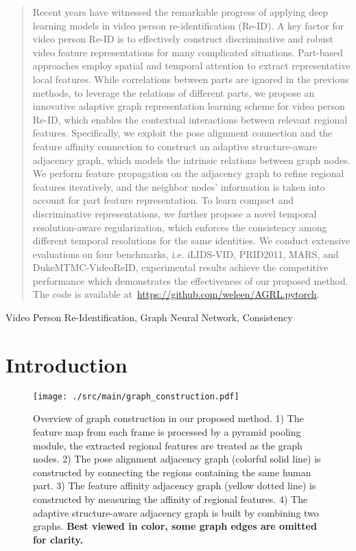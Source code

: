 \documentclass[journal]{IEEEtran}
\let\MYoriglatexcaption\caption
\renewcommand{\caption}[2][\relax]{\MYoriglatexcaption[#2]{#2}}
\begin{document}
\begin{abstract}
Recent years have witnessed the remarkable progress of applying deep learning models in video person re-identification (Re-ID). A key factor for video person Re-ID is to effectively construct discriminative and robust video feature representations for many complicated situations. Part-based approaches employ spatial and temporal attention to extract representative local features. While correlations between parts are ignored in the previous methods, to leverage the relations of different parts, we propose an innovative adaptive graph representation learning scheme for video person Re-ID, which enables the contextual interactions between relevant regional features. Specifically, we exploit the pose alignment connection and the feature affinity connection to construct an adaptive structure-aware adjacency graph, which models the intrinsic relations between graph nodes. We perform feature propagation on the adjacency graph to refine regional features iteratively, and the neighbor nodes' information is taken into account for part feature representation. To learn compact and discriminative representations, we further propose a novel temporal resolution-aware regularization, which enforces the consistency among different temporal resolutions for the same identities. We conduct extensive evaluations on four benchmarks, i.e. iLIDS-VID, PRID2011, MARS, and DukeMTMC-VideoReID, experimental results achieve the competitive performance which demonstrates the effectiveness of our proposed method. The code is available at~\url{https://github.com/weleen/AGRL.pytorch}.
\end{abstract}

\begin{IEEEkeywords}
Video Person Re-Identification, Graph Neural Network, Consistency
\end{IEEEkeywords}

\IEEEpeerreviewmaketitle

\section{Introduction}\label{sec:introduction}
\begin{figure}[t]
    \begin{center}
        \texttt{[image: ./src/main/graph\_construction.pdf]}
    \end{center}
    \caption{Overview of graph construction in our proposed method. 1) The feature map from each frame is processed by a pyramid pooling module, the extracted regional features are treated as the graph nodes. 2) The pose alignment adjacency graph  (colorful solid line) is constructed by connecting the regions containing the same human part. 3) The feature affinity adjacency graph  (yellow dotted line) is constructed by measuring the affinity of regional features. 4) The adaptive structure-aware adjacency graph is built by combining two graphs. \textbf{Best viewed in color, some graph edges are omitted for clarity.}}
\label{fig:graph construction}
\end{figure}
\end{document}
